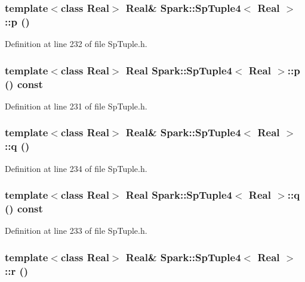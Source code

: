 \subsubsection{\setlength{\rightskip}{0pt plus 5cm}template$<$class Real$>$ Real\& {\bf Spark::Sp\-Tuple4}$<$ Real $>$::p ()\hspace{0.3cm}{\tt  [inline]}}\label{classSpark_1_1SpTuple4_a23}


Definition at line 232 of file Sp\-Tuple.h.
\subsubsection{\setlength{\rightskip}{0pt plus 5cm}template$<$class Real$>$ Real {\bf Spark::Sp\-Tuple4}$<$ Real $>$::p () const\hspace{0.3cm}{\tt  [inline]}}\label{classSpark_1_1SpTuple4_a22}


Definition at line 231 of file Sp\-Tuple.h.
\subsubsection{\setlength{\rightskip}{0pt plus 5cm}template$<$class Real$>$ Real\& {\bf Spark::Sp\-Tuple4}$<$ Real $>$::q ()\hspace{0.3cm}{\tt  [inline]}}\label{classSpark_1_1SpTuple4_a25}


Definition at line 234 of file Sp\-Tuple.h.
\subsubsection{\setlength{\rightskip}{0pt plus 5cm}template$<$class Real$>$ Real {\bf Spark::Sp\-Tuple4}$<$ Real $>$::q () const\hspace{0.3cm}{\tt  [inline]}}\label{classSpark_1_1SpTuple4_a24}


Definition at line 233 of file Sp\-Tuple.h.
\subsubsection{\setlength{\rightskip}{0pt plus 5cm}template$<$class Real$>$ Real\& {\bf Spark::Sp\-Tuple4}$<$ Real $>$::r ()\hspace{0.3cm}{\tt  [inline]}}\label{classSpark_1_1SpTuple4_a11}


